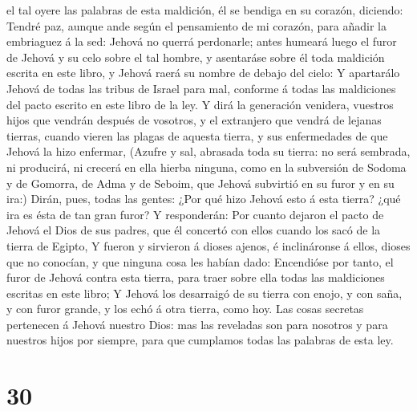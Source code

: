 el tal oyere las palabras de esta maldición, él se bendiga en su
corazón, diciendo: Tendré paz, aunque ande según el pensamiento de mi
corazón, para añadir la embriaguez á la sed:  Jehová no
querrá perdonarle; antes humeará luego el furor de Jehová y su celo
sobre el tal hombre, y asentaráse sobre él toda maldición escrita en
este libro, y Jehová raerá su nombre de debajo del cielo: 
Y apartarálo Jehová de todas las tribus de Israel para mal, conforme á
todas las maldiciones del pacto escrito en este libro de la ley.
 Y dirá la generación venidera, vuestros hijos que vendrán
después de vosotros, y el extranjero que vendrá de lejanas tierras,
cuando vieren las plagas de aquesta tierra, y sus enfermedades de que
Jehová la hizo enfermar,  (Azufre y sal, abrasada toda su
tierra: no será sembrada, ni producirá, ni crecerá en ella hierba
ninguna, como en la subversión de Sodoma y de Gomorra, de Adma y de
Seboim, que Jehová subvirtió en su furor y en su ira:) 
Dirán, pues, todas las gentes: ¿Por qué hizo Jehová esto á esta tierra?
¿qué ira es ésta de tan gran furor?  Y responderán: Por
cuanto dejaron el pacto de Jehová el Dios de sus padres, que él concertó
con ellos cuando los sacó de la tierra de Egipto,  Y fueron
y sirvieron á dioses ajenos, é inclináronse á ellos, dioses que no
conocían, y que ninguna cosa les habían dado:  Encendióse
por tanto, el furor de Jehová contra esta tierra, para traer sobre ella
todas las maldiciones escritas en este libro;  Y Jehová los
desarraigó de su tierra con enojo, y con saña, y con furor grande, y los
echó á otra tierra, como hoy.  Las cosas secretas
pertenecen á Jehová nuestro Dios: mas las reveladas son para nosotros y
para nuestros hijos por siempre, para que cumplamos todas las palabras
de esta ley.

\hypertarget{section-29}{%
\section{30}\label{section-29}}

